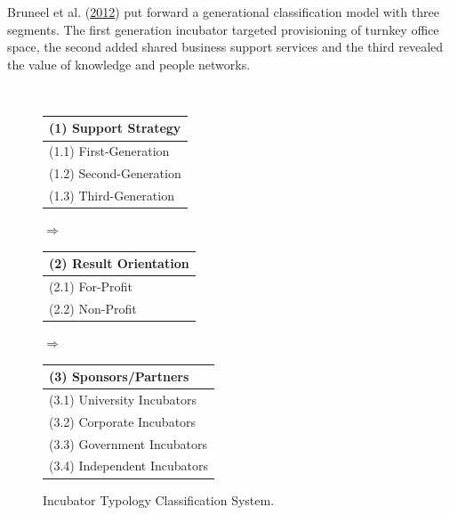 \documentclass[
  12pt,
]{article}
\begin{document}
Bruneel et al. (\protect\hyperlink{ref-bruneel_evolution_2012}{2012}) put forward a generational classification model with three segments. The first generation incubator targeted provisioning of turnkey office space, the second added shared business support services and the third revealed the value of knowledge and people networks.

~
~

\begin{figure}[h!]
\begin{minipage}{0.25\textwidth}
\begingroup\fontsize{9}{11}\selectfont

\begin{tabu} to 
\toprule
(1) Support Strategy\\
\midrule
(1.1) First-Generation\\
(1.2) Second-Generation\\
(1.3) Third-Generation\\
\bottomrule
\end{tabu}
\endgroup{}
\end{minipage}
\qquad
\begin{minipage}{0.05\textwidth}
$\Rightarrow$
\end{minipage}
\begin{minipage}{0.25\textwidth}
\begingroup\fontsize{9}{11}\selectfont

\begin{tabu} to 
\toprule
(2) Result Orientation\\
\midrule
(2.1) For-Profit\\
(2.2) Non-Profit\\
\bottomrule
\end{tabu}
\endgroup{}
\end{minipage}
\qquad
\begin{minipage}{0.05\textwidth}
$\Rightarrow$
\end{minipage}
\begin{minipage}{0.25\textwidth}
\begingroup\fontsize{9}{11}\selectfont

\begin{tabu} to 
\toprule
(3) Sponsors/Partners\\
\midrule
(3.1) University Incubators\\
(3.2) Corporate Incubators\\
(3.3) Government Incubators\\
(3.4) Independent Incubators\\
\bottomrule
\end{tabu}
\endgroup{}
\end{minipage}
\caption{Incubator Typology Classification System.}
\label{typologyclassificationfig}
\end{figure}
\end{document}
